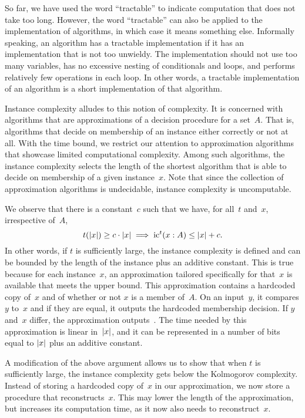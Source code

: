 \begin{example}
\label{ex:ic}%
  So far, we have used the word \enquote{tractable} to indicate computation that does not take too long.
  However, the word \enquote{tractable} can also be applied to the implementation of algorithms, in which case it means something else.
  Informally speaking, an algorithm has a tractable implementation if it has an implementation that is not too unwieldy.
  The implementation should not use too many variables, has no excessive nesting of conditionals and loops, and performs relatively few operations in each loop.
  In other words, a tractable implementation of an algorithm is a short implementation of that algorithm.

  Instance complexity alludes to this notion of complexity.
  It is concerned with algorithms that are approximations of a decision procedure for a set~$A$.
  That is, algorithms that decide on membership of an instance either correctly or not at all.
  With the time bound, we restrict our attention to approximation algorithms that showcase limited computational complexity.
  Among such algorithms, the instance complexity selects the length of the shortest algorithm that is able to decide on membership of a given instance~$x$.
  Note that since the collection of approximation algorithms is undecidable, instance complexity is uncomputable.

  We observe that there is a constant~$c$ such that we have, for all~$t$ and~$x$, irrespective of~$A$,
  \begin{equation*}
    t({\lvert x\rvert}) \ge c \cdot {\lvert x\rvert} \implies \operatorname{ic}^t(x : A) \le {\lvert x\rvert} + c.
  \end{equation*}
  In other words, if $t$ is sufficiently large, the instance complexity is defined and can be bounded by the length of the instance plus an additive constant.
  This is true because for each instance~$x$, an approximation tailored specifically for that~$x$ is available that meets the upper bound.
  This approximation contains a hardcoded copy of~$x$ and of whether or not $x$ is a member of~$A$.
  On an input~$y$, it compares $y$ to~$x$ and if they are equal, it outputs the hardcoded membership decision.
  If $y$ and~$x$ differ, the approximation outputs~.
  The time needed by this approximation is linear in~${\lvert x\rvert}$, and it can be represented in a number of bits equal to ${\lvert x\rvert}$ plus an additive constant.

  A modification of the above argument allows us to show that when $t$ is sufficiently large, the instance complexity gets below the Kolmogorov complexity.
  Instead of storing a hardcoded copy of~$x$ in our approximation, we now store a procedure that reconstructs~$x$.
  This may lower the length of the approximation, but increases its computation time, as it now also needs to reconstruct~$x$.
\end{example}

